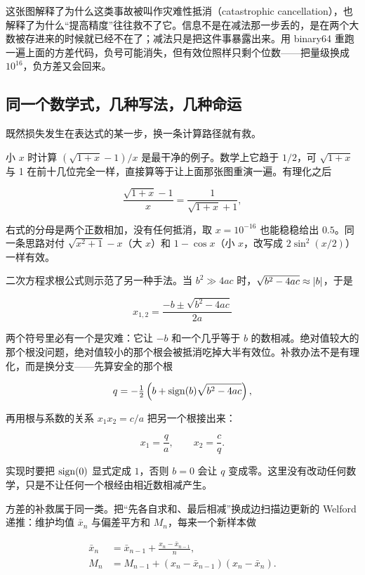这张图解释了为什么这类事故被叫作灾难性抵消（catastrophic cancellation），也解释了为什么``提高精度''往往救不了它。信息不是在减法那一步丢的，是在两个大数被存进来的时候就已经不在了；减法只是把这件事暴露出来。用 binary64 重跑一遍上面的方差代码，负号可能消失，但有效位照样只剩个位数——把量级换成 \(10^{16}\)，负方差又会回来。

\subsection{同一个数学式，几种写法，几种命运}

既然损失发生在表达式的某一步，换一条计算路径就有救。

小 \(x\) 时计算 \((\sqrt{1+x}-1)/x\) 是最干净的例子。数学上它趋于 \(1/2\)，可 \(\sqrt{1+x}\) 与 1 在前十几位完全一样，直接算等于让上面那张图重演一遍。有理化之后

\[
\frac{\sqrt{1+x}-1}{x}=\frac{1}{\sqrt{1+x}+1},
\]

右式的分母是两个正数相加，没有任何抵消，取 \(x=10^{-16}\) 也能稳稳给出 \(0.5\)。同一条思路对付 \(\sqrt{x^2+1}-x\)（大 \(x\)）和 \(1-\cos x\)（小 \(x\)，改写成 \(2\sin^2(x/2)\)）一样有效。

二次方程求根公式则示范了另一种手法。当 \(b^2\gg 4ac\) 时，\(\sqrt{b^2-4ac}\approx\left|b\right|\)，于是

\[
x_{1,2}=\frac{-b\pm\sqrt{b^2-4ac}}{2a}
\]

两个符号里必有一个是灾难：它让 \(-b\) 和一个几乎等于 \(b\) 的数相减。绝对值较大的那个根没问题，绝对值较小的那个根会被抵消吃掉大半有效位。补救办法不是有理化，而是换分支——先算安全的那个根

\[
q=-\tfrac12\left(b+\operatorname{sign}(b)\sqrt{b^2-4ac}\right),
\]

再用根与系数的关系 \(x_1x_2=c/a\) 把另一个根接出来：

\[
x_1=\frac{q}{a},\qquad x_2=\frac{c}{q}.
\]

实现时要把 \(\operatorname{sign}(0)\) 显式定成 \(1\)，否则 \(b=0\) 会让 \(q\) 变成零。这里没有改动任何数学，只是不让任何一个根经由相近数相减产生。

方差的补救属于同一类。把``先各自求和、最后相减''换成边扫描边更新的 Welford 递推：维护均值 \(\bar x_n\) 与偏差平方和 \(M_n\)，每来一个新样本做

\[
\begin{aligned}
\bar x_n&=\bar x_{n-1}+\frac{x_n-\bar x_{n-1}}{n},\\
M_n&=M_{n-1}+(x_n-\bar x_{n-1})(x_n-\bar x_n).
\end{aligned}
\]

